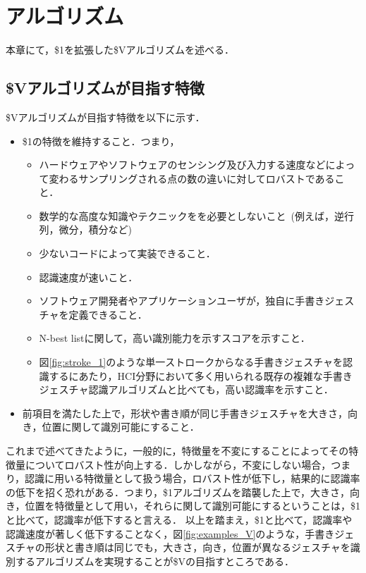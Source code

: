 \chapter{\SysName アルゴリズム}
本章にて，\$1を拡張した\$Vアルゴリズムを述べる．

\section{\$Vアルゴリズムが目指す特徴}
\$Vアルゴリズムが目指す特徴を以下に示す．
\begin{itemize}
\item \$1の特徴を維持すること．つまり，
\begin{itemize}
\item ハードウェアやソフトウェアのセンシング及び入力する速度などによって変わるサンプリングされる点の数の違いに対してロバストであること．
\item 数学的な高度な知識やテクニックをを必要としないこと~(例えば，逆行列，微分，積分など)
\item 少ないコードによって実装できること．
\item 認識速度が速いこと．
\item ソフトウェア開発者やアプリケーションユーザが，独自に手書きジェスチャを定義できること．
\item N-best listに関して，高い識別能力を示すスコアを示すこと．
\item 図\ref{fig:stroke_1}のような単一ストロークからなる手書きジェスチャを認識するにあたり，HCI分野において多く用いられる既存の複雑な手書きジェスチャ認識アルゴリズムと比べても，高い認識率を示すこと．
\end{itemize}
\item 前項目を満たした上で，形状や書き順が同じ手書きジェスチャを大きさ，向き，位置に関して識別可能にすること．
\end{itemize}

これまで述べてきたように，一般的に，特徴量を不変にすることによってその特徴量についてロバスト性が向上する．しかしながら，不変にしない場合，つまり，認識に用いる特徴量として扱う場合，ロバスト性が低下し，結果的に認識率の低下を招く恐れがある．つまり，\$1アルゴリズムを踏襲した上で，大きさ，向き，位置を特徴量として用い，それらに関して識別可能にするということは，\$1と比べて，認識率が低下すると言える．
以上を踏まえ，\$1と比べて，認識率や認識速度が著しく低下することなく，図\ref{fig:examples_V}のような，手書きジェスチャの形状と書き順は同じでも，大きさ，向き，位置が異なるジェスチャを識別するアルゴリズムを実現することが\$Vの目指すところである．


